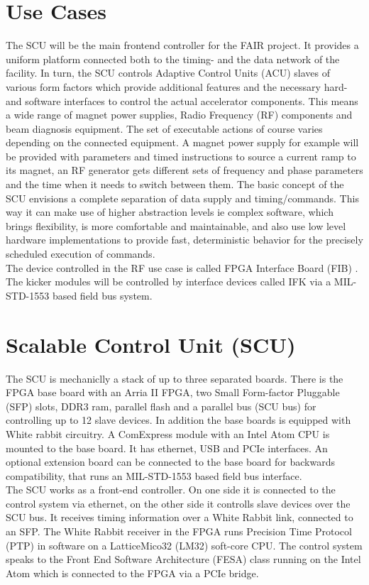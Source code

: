 \documentclass{JAC2003}
\begin{document}
\section{Use Cases}
The SCU will be the main frontend controller for the FAIR project.
It provides a uniform platform connected both to the timing- and the data network of the facility. 
In turn, the SCU controls Adaptive Control Units (ACU) \cite{acuref} slaves of various form factors which provide additional
features and the necessary hard- and software interfaces to control the actual accelerator components.
This means a wide range of magnet power supplies, Radio Frequency (RF) components and beam diagnosis equipment.
The set of executable actions of course varies depending on the connected equipment.
A magnet power supply for example will be provided with parameters and timed instructions to source
a current ramp to its magnet, an RF generator gets different sets of frequency and phase parameters and the time when it needs to switch between them. 
The basic concept of the SCU envisions a complete separation of data supply and timing/commands.
This way it can make use of higher abstraction levels ie complex software, which brings flexibility, is more comfortable and maintainable, and also use low level hardware implementations to provide fast, deterministic behavior for the precisely scheduled execution of commands.\\
The device controlled in the RF use case is called FPGA Interface Board (FIB) \cite{fibref}.\\
The kicker modules will be controlled by interface devices called IFK via a MIL-STD-1553
based field bus system.


\section{Scalable Control Unit (SCU)}
The SCU is mechaniclly a stack of up to three separated boards. There is the FPGA base board
with an Arria II FPGA, two Small Form-factor Pluggable (SFP) slots, DDR3 ram, parallel flash and a parallel bus (SCU bus) for
controlling up to 12 slave devices. In addition the base boards is equipped with White rabbit circuitry.
A ComExpress module with an Intel Atom CPU is mounted to
the base board. It has ethernet, USB and PCIe interfaces. An optional extension board can
be connected to the base board for backwards compatibility, that runs an MIL-STD-1553 based
field bus interface.\\
The SCU works as a front-end controller. On one side it is connected to the control system via ethernet,
on the other side it controlls slave devices over the SCU bus. It receives timing information over
a White Rabbit link, connected to an SFP. The White Rabbit receiver in the FPGA runs  Precision Time Protocol  (PTP) in software
on a LatticeMico32 (LM32) soft-core CPU. The control system speaks to the Front End Software Architecture (FESA) class running
on the Intel Atom which is connected to the FPGA via a PCIe bridge.
 
\end{document}
